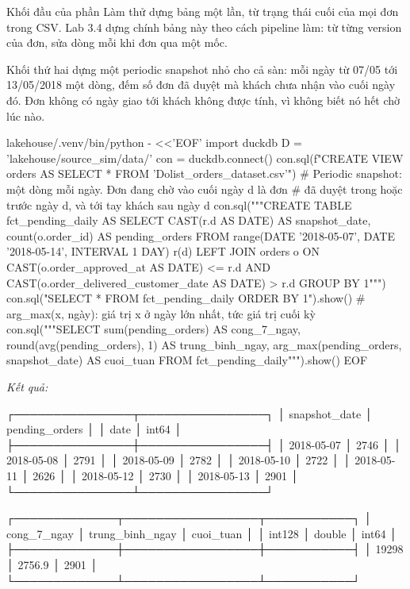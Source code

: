 Khối đầu của phần Làm thử dựng bảng một lần, từ trạng thái cuối của mọi đơn trong CSV. Lab 3.4 dựng chính bảng này theo cách pipeline làm: từ từng version của đơn, sửa dòng mỗi khi đơn qua một mốc.

Khối thứ hai dựng một periodic snapshot nhỏ cho cả sàn: mỗi ngày từ 07/05 tới 13/05/2018 một dòng, đếm số đơn đã duyệt mà khách chưa nhận vào cuối ngày đó. Đơn không có ngày giao tới khách không được tính, vì không biết nó hết chờ lúc nào.

\begin{codeblock}
lakehouse/.venv/bin/python - <<'EOF'
import duckdb
D = 'lakehouse/source_sim/data/'
con = duckdb.connect()
con.sql(f"CREATE VIEW orders AS SELECT * FROM '{D}olist_orders_dataset.csv'")
# Periodic snapshot: một dòng mỗi ngày. Đơn đang chờ vào cuối ngày d là đơn
# đã duyệt trong hoặc trước ngày d, và tới tay khách sau ngày d
con.sql("""CREATE TABLE fct_pending_daily AS
  SELECT CAST(r.d AS DATE) AS snapshot_date, count(o.order_id) AS pending_orders
  FROM range(DATE '2018-05-07', DATE '2018-05-14', INTERVAL 1 DAY) r(d)
  LEFT JOIN orders o
    ON CAST(o.order_approved_at AS DATE) <= r.d
   AND CAST(o.order_delivered_customer_date AS DATE) > r.d
  GROUP BY 1""")
con.sql("SELECT * FROM fct_pending_daily ORDER BY 1").show()
# arg_max(x, ngày): giá trị x ở ngày lớn nhất, tức giá trị cuối kỳ
con.sql("""SELECT sum(pending_orders) AS cong_7_ngay,
                  round(avg(pending_orders), 1) AS trung_binh_ngay,
                  arg_max(pending_orders, snapshot_date) AS cuoi_tuan
           FROM fct_pending_daily""").show()
EOF
\end{codeblock}
\textit{Kết quả:}
\begin{codeblock}
┌───────────────┬────────────────┐
│ snapshot_date │ pending_orders │
│     date      │     int64      │
├───────────────┼────────────────┤
│ 2018-05-07    │           2746 │
│ 2018-05-08    │           2791 │
│ 2018-05-09    │           2782 │
│ 2018-05-10    │           2722 │
│ 2018-05-11    │           2626 │
│ 2018-05-12    │           2730 │
│ 2018-05-13    │           2901 │
└───────────────┴────────────────┘

┌─────────────┬─────────────────┬───────────┐
│ cong_7_ngay │ trung_binh_ngay │ cuoi_tuan │
│   int128    │     double      │   int64   │
├─────────────┼─────────────────┼───────────┤
│       19298 │          2756.9 │      2901 │
└─────────────┴─────────────────┴───────────┘
\end{codeblock}

